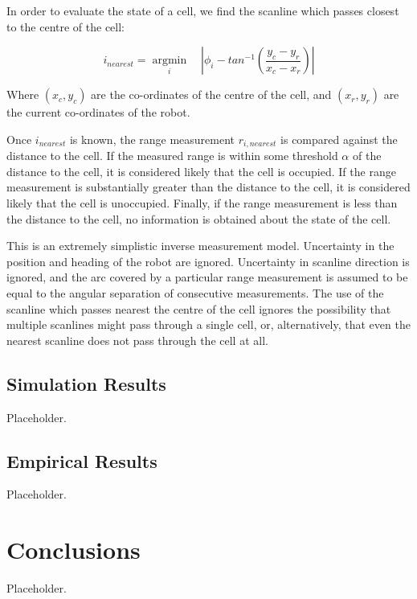 \documentclass[11pt]{article} %
\begin{document}
In order to evaluate the state of a cell, we find the scanline which passes closest to the centre of the cell:

\begin{equation}
i_{nearest} = \underset{i}{\operatorname{argmin}} \quad | \phi_i - tan^{-1}(\frac{y_c - y_r}{x_c - x_r}) |
\end{equation}

Where $(x_c, y_c)$ are the co-ordinates of the centre of the cell, and $(x_r, y_r)$ are the current co-ordinates of the robot.  

Once $i_{nearest}$ is known, the range measurement $r_{i,nearest}$ is compared against the distance to the cell.  If the measured range is within some threshold $\alpha$ of the distance to the cell, it is considered likely that the cell is occupied.  If the range measurement is substantially greater than the distance to the cell, it is considered likely that the cell is unoccupied.  Finally, if the range measurement is less than the distance to the cell, no information is obtained about the state of the cell.

This is an extremely simplistic inverse measurement model.  Uncertainty in the position and heading of the robot are ignored.  Uncertainty in scanline direction is ignored, and the arc covered by a particular range measurement is assumed to be equal to the angular separation of consecutive measurements.  The use of the scanline which passes nearest the centre of the cell ignores the possibility that multiple scanlines might pass through a single cell, or, alternatively, that even the nearest scanline does not pass through the cell at all.  

\subsection{Simulation Results}

Placeholder.

\subsection{Empirical Results}

Placeholder.

\section{Conclusions}

Placeholder.
\end{document}
